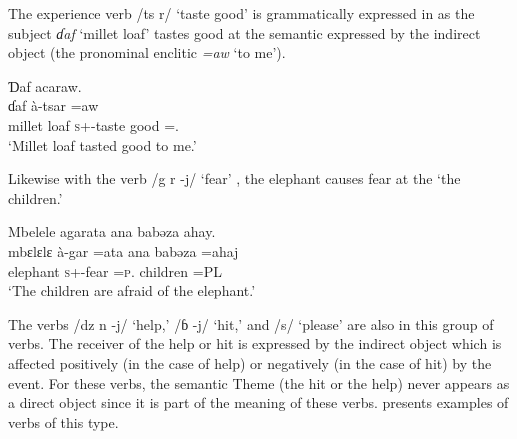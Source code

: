 The experience verb  /ts r/ ‘taste good’ is grammatically expressed in  as the subject \textit{ɗaf}  ‘millet loaf' tastes good at the semantic \LOC expressed by the indirect object (the pronominal enclitic \textit{=aw} ‘to me’).

\ea \label{ex:9:11}
Ɗaf  acaraw. \\
\gll  ɗaf     à-tsar      =aw \\
      {millet loaf}  {\textsc{s}+{\PFV}-taste good}  ={\oneS}.{\IO}\\
\glt  ‘Millet loaf tasted good to me.’ 
\z

Likewise with the verb /g r -j/  ‘fear’ ,  the elephant causes fear at the \LOC ‘the children.’

\ea \label{ex:9:12}
Mbelele  agarata  ana  babəza  ahay. \\
\gll  mbɛlɛlɛ   à-gar    =ata  ana  babəza    =ahaj\\
      elephant  \textsc{s}+{\PFV}-fear  =\textsc{p}.{\IO}  {\DAT} children    =PL\\
\glt  ‘The children are afraid of the elephant.’
\z

The verbs /dz n -j/ ‘help,’ /ɓ -j/ ‘hit,’ and /s/ ‘please' are also in this group of verbs. The receiver of the help or hit is expressed by the indirect object which is affected positively (in the case of help) or negatively (in the case of hit) by the event. For these verbs, the semantic Theme (the hit or the help) never appears as a direct object since it is part of the meaning of these verbs.  presents examples of verbs of this type.

